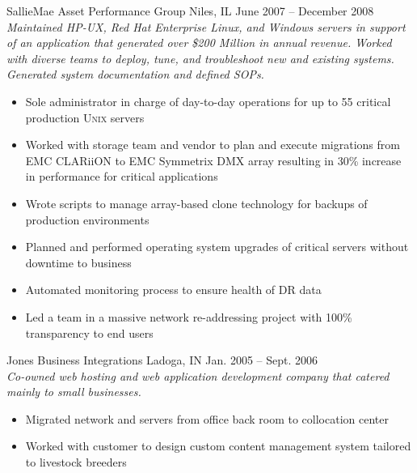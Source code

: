 \documentclass[9pt]{extarticle} %
\begin{document}
\begin{indented}
	SallieMae Asset Performance Group \tab Niles, IL \tab June 2007 -- December 2008\\
	\textit{Maintained HP-UX, Red Hat Enterprise Linux, and Windows servers in support of an application that generated over \$200 Million in annual revenue. Worked with diverse teams to deploy, tune, and troubleshoot new and existing systems. Generated system documentation and defined SOPs.}
	\begin{itemize}
		\item Sole administrator in charge of day-to-day operations for up to 55 critical production \textsc{Unix} servers
		\item Worked with storage team and vendor to plan and execute migrations from EMC CLARiiON to EMC Symmetrix DMX array resulting in 30\% increase in performance for critical applications
		\item Wrote scripts to manage array-based clone technology for backups of production environments
		\item Planned and performed operating system upgrades of critical servers without downtime to business
		\item Automated monitoring process to ensure health of DR data
		\item Led a team in a massive network re-addressing project with 100\% transparency to end users
	\end{itemize}
\end{indented}

\bigskip



\begin{indented}
	Jones Business Integrations \tab Ladoga, IN \tab Jan. 2005 -- Sept. 2006\\
	\textit{Co-owned web hosting and web application development company that catered mainly to small businesses.}
	\begin{itemize}
		\item Migrated network and servers from office back room to collocation center
		\item Worked with customer to design custom content management system tailored to livestock breeders
	\end{itemize}
\end{indented}

\bigskip
\end{document}
